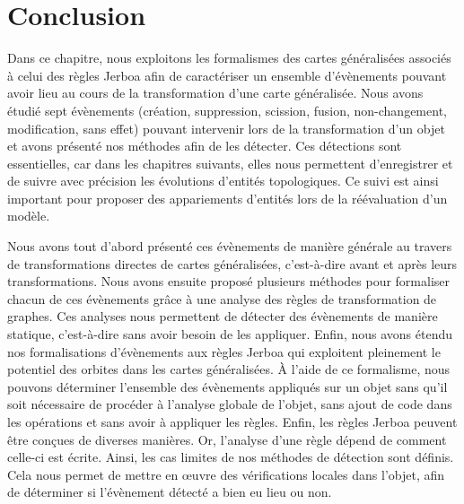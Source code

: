 \section{Conclusion}
\label{sec:formalisation-evenements-conclusion}

Dans ce chapitre, nous exploitons les formalismes des cartes généralisées
associés à celui des règles Jerboa afin de caractériser un ensemble d'évènements
pouvant avoir lieu au cours de la transformation d'une carte généralisée. %
Nous avons étudié sept évènements (création, suppression, scission,
fusion, non-changement, modification, sans effet) pouvant intervenir lors de la
transformation d'un objet et avons présenté nos méthodes afin de les détecter. %
Ces détections sont essentielles, car dans les chapitres suivants, elles nous
permettent d'enregistrer et de suivre avec précision les évolutions
d'entités topologiques. %
Ce suivi est ainsi important pour proposer des appariements d'entités lors de la
réévaluation d'un modèle. %


Nous avons tout d'abord présenté ces évènements de manière générale au travers
de transformations directes de cartes généralisées, c'est-à-dire avant et après
leurs transformations. %
Nous avons ensuite proposé plusieurs méthodes pour formaliser chacun de ces
évènements grâce à une analyse des règles de transformation de graphes. %
Ces analyses nous permettent de détecter des évènements de manière statique,
c'est-à-dire sans avoir besoin de les appliquer. %
Enfin, nous avons étendu nos formalisations d'évènements aux règles Jerboa qui
exploitent pleinement le potentiel des orbites dans les cartes généralisées. %
À l'aide de ce formalisme, nous pouvons déterminer l'ensemble des évènements
appliqués sur un objet sans qu'il soit nécessaire de procéder à l'analyse globale
de l'objet, sans ajout de code dans les opérations et sans avoir à appliquer les
règles. %
Enfin, les règles Jerboa peuvent être conçues de diverses manières. Or, l'analyse
d'une règle dépend de comment celle-ci est écrite. %
Ainsi, les cas limites de nos méthodes de détection sont définis. %
Cela nous permet de mettre en \oe uvre des vérifications locales dans l'objet,
afin de déterminer si l'évènement détecté a bien eu lieu ou non. %


